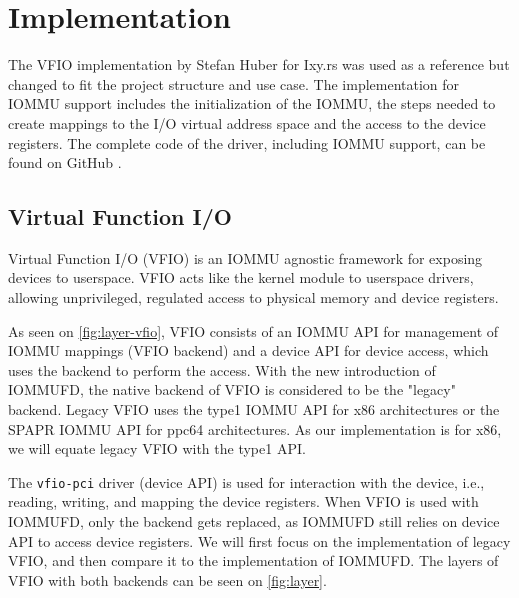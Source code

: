 \chapter{Implementation} \label{c:impl}

The VFIO implementation by Stefan Huber for Ixy.rs was used as a reference but changed to fit the project structure and use case. The implementation for IOMMU support includes the initialization of the IOMMU, the steps needed to create mappings to the I/O virtual address space and the access to the device registers. The complete code of the driver, including IOMMU support, can be found on GitHub \cite{vroomsource}.

\section{Virtual Function I/O}
Virtual Function I/O (VFIO) is an IOMMU agnostic framework for exposing devices to userspace. VFIO acts like the kernel module to userspace drivers, allowing unprivileged, regulated access to physical memory and device registers.

As seen on \autoref{fig:layer-vfio}, VFIO consists of an IOMMU API for management of IOMMU mappings (VFIO backend) and a device API for device access, which uses the backend to perform the access. With the new introduction of IOMMUFD, the native backend of VFIO is considered to be the "legacy" backend. Legacy VFIO uses the type1 IOMMU API for x86 architectures or the SPAPR IOMMU API for ppc64 architectures. As our implementation is for x86, we will equate legacy VFIO with the type1 API.

The \texttt{vfio-pci} driver (device API) is used for interaction with the device, i.e., reading, writing, and mapping the device registers. When VFIO is used with IOMMUFD, only the backend gets replaced, as IOMMUFD still relies on device API to access device registers. We will first focus on the implementation of legacy VFIO, and then compare it to the implementation of IOMMUFD.
The layers of VFIO with both backends can be seen on \autoref{fig:layer}.

